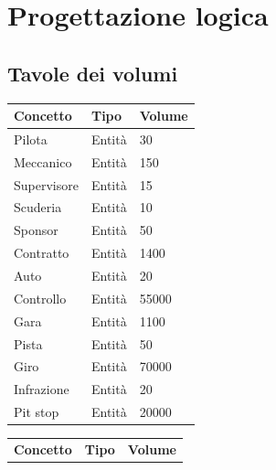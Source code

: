 \documentclass[11pt]{article}
\begin{document}
\section{Progettazione logica}
\subsection{Tavole dei volumi}
\begin{center}
    \begin{tabular}{ |l|l|l| }
        \hline
        \textbf{Concetto} & \textbf{Tipo} & \textbf{Volume} \\
        
        \hline
        Pilota & Entità & 30 \\
        \hline
        Meccanico & Entità & 150 \\
        \hline
        Supervisore & Entità & 15 \\
        \hline
        Scuderia & Entità & 10 \\
        \hline
        Sponsor & Entità & 50 \\
        \hline
        Contratto & Entità & 1400 \\
        \hline
        Auto & Entità & 20 \\
        \hline
        Controllo & Entità & 55000 \\ %
        \hline
        Gara & Entità & 1100 \\
        \hline
        Pista & Entità & 50 \\
        \hline
        Giro & Entità & 70000 \\ %
        \hline
        Infrazione & Entità & 20 \\
        \hline
        Pit stop & Entità & 20000 \\
        \hline
    \end{tabular}
        \quad
    \begin{tabular}{ |l|l|l| }
        \hline
        \textbf{Concetto} & \textbf{Tipo} & \textbf{Volume} \\


\end{tabular}
\end{center}
\end{document}
